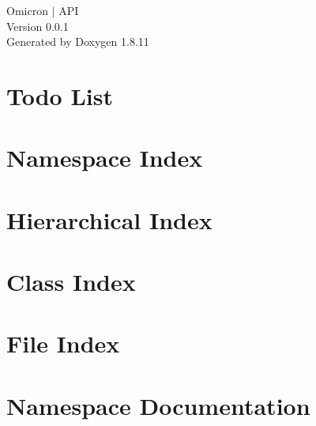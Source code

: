 \documentclass[twoside]{book}
\newcommand{\+}{\discretionary{\mbox{\scriptsize$\hookleftarrow$}}{}{}}
\newcommand{\clearemptydoublepage}{%
  \newpage{\pagestyle{empty}\cleardoublepage}%
}
\begin{document}
\hypersetup{pageanchor=false,
             bookmarksnumbered=true,
             pdfencoding=unicode
            }
\begin{titlepage}
\vspace*{7cm}
\begin{center}%
{\Large Omicron $\vert$ A\+PI \\[1ex]\large Version 0.\+0.\+1 }\\
\vspace*{1cm}
{\large Generated by Doxygen 1.8.11}\\
\end{center}
\end{titlepage}
\clearemptydoublepage
\tableofcontents
\clearemptydoublepage
{}
\hypersetup{pageanchor=true}

\chapter{Todo List}
\label{todo}
\hypertarget{todo}{}

\chapter{Namespace Index}

\chapter{Hierarchical Index}

\chapter{Class Index}

\chapter{File Index}

\chapter{Namespace Documentation}















\end{document}
